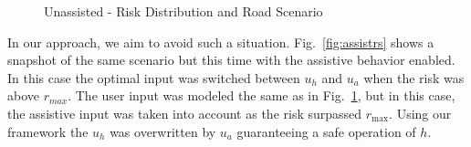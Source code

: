 \documentclass[letterpaper, 10 pt, conference]{ieeeconf}  %
\begin{document}
\begin{figure}[ht!]
	\centering
	\vspace{-5pt}
	\caption{Unassisted - Risk Distribution and Road Scenario}
	\label{fig:noassist}
	\vspace{-5pt}
\end{figure}

In our approach, we aim to avoid such a situation. Fig.~\ref{fig:assistrs} shows a snapshot of the same scenario but this time with the assistive behavior enabled. In this case the optimal input was switched between $u_h$ and $u_a$ when the risk was above $r_{max}$. 
The user input was modeled the same as in Fig.~\ref{fig:noassist}, but in this case, the assistive input was taken into account as the risk surpassed $r_{\max}$. Using our framework the $u_h$ was overwritten by $u_a$ guaranteeing a safe operation of $h$.
\end{document}
